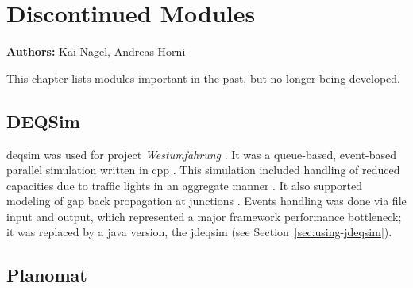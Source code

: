 \chapter{Discontinued Modules}
\label{ch:discontinued}

\hfill \textbf{Authors:} Kai Nagel, Andreas Horni


This chapter lists modules important in the past, but no longer being developed.

\section{DEQSim}
\label{sec:deqsim}
\gls{deqsim} was used for project \emph{Westumfahrung} \citep[][]{BalmerEtAl_ResRep_bdktzrh_2009}. It was a queue-based, event-based parallel simulation written in \gls{cpp} \citep[][]{CharyparEtAl_TRR_2007, Charypar_PhDThesis_2008}. This simulation included handling of reduced capacities due to traffic lights in an aggregate manner \citep[][p.139 ff]{Charypar_PhDThesis_2008}. It also supported modeling of gap back propagation at junctions \citep[][p.98 ff]{Charypar_PhDThesis_2008}. Events handling was done via file input and output, which represented a major framework performance bottleneck; it was replaced by a \gls{java} version, the \gls{jdeqsim} (see Section~\ref{sec:using-jdeqsim}).

\section{Planomat}
\label{sec:planomat}


